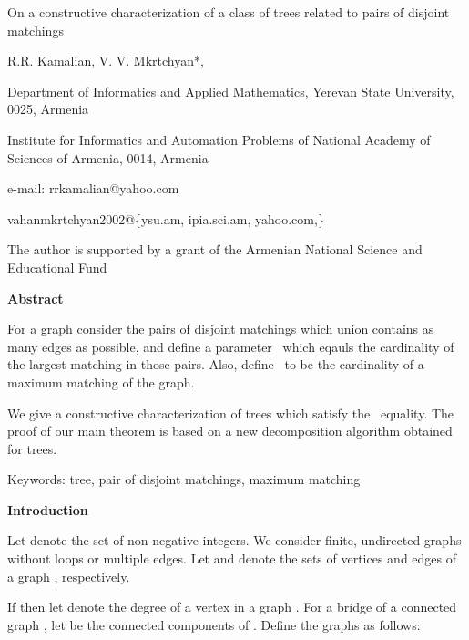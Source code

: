 \documentclass{article}
\begin{document}
\begin{center}
{\Large On a constructive characterization of a class of trees related to
pairs of disjoint matchings}

R.R. Kamalian, V. V. Mkrtchyan*,

{\small *Department of Informatics and Applied Mathematics, Yerevan State
University, 0025, Armenia}

{\small Institute for Informatics and Automation Problems of
National Academy of Sciences of Armenia, 0014, Armenia}

{\small e-mail: rrkamalian@yahoo.com}

{\small vahanmkrtchyan2002@\{ysu.am, ipia.sci.am, yahoo.com,\}}

{\small The author is supported by a grant of the Armenian
National Science and Educational Fund}
\end{center}

\bigskip

\begin{center}
\textbf{Abstract}
\end{center}

{\small For a graph consider the pairs of disjoint matchings which union
contains as many edges as possible, and define a parameter }{\small \ which eqauls the cardinality of the largest matching in those pairs. Also,
define }{\small \ to be the cardinality of a maximum matching of the
graph.}

{\small We give a constructive characterization of trees which satisfy the }{\small \ equality. The proof of our main theorem is based on
a new decomposition algorithm obtained for trees.}

{\small Keywords: tree, pair of disjoint matchings, maximum matching}

\bigskip

\begin{center}
\textbf{Introduction}\bigskip
\end{center}

Let  denote the set of non-negative integers. We consider finite,
undirected graphs without loops or multiple edges. Let  and 
denote the sets of vertices and edges of a graph , respectively.

If  then let  denote the degree of a vertex  in a
graph . For a bridge  of a connected graph , let  be the connected components of . Define the graphs  as follows:

\begin{center}



\end{center}
\end{document}
